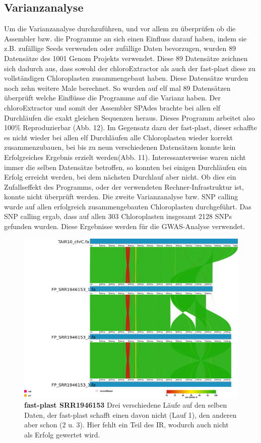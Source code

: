 \documentclass{scrartcl}
\begin{document}
\subsection{Varianzanalyse}
\label{sec-4-7}
Um die Varianzanalyse durchzuführen, und vor allem zu überprüfen ob die Assembler bzw. die Programme an sich einen Einfluss darauf haben, indem sie z.B. zufällige Seeds verwenden oder zufällige Daten bevorzugen, wurden 89 Datensätze
des 1001 Genom Projekts verwendet. Diese 89 Datensätze zeichnen sich dadurch aus, dass sowohl der chloroExtractor als auch der fast-plast diese zu vollständigen Chloroplasten zusammengebaut haben. Diese Datensätze
wurden noch zehn weitere Male berechnet. So wurden auf elf mal 89 Datensätzen überprüft welche Einflüsse die Programme auf die Varianz haben. Der chloroExtractor und somit der Assembler SPAdes brachte bei allen elf
Durchläufen die exakt gleichen Sequenzen heraus. Dieses Programm arbeitet also 100\% Reproduzierbar (Abb. 12). Im Gegensatz dazu der fast-plast, dieser schaffte es nicht wieder bei allen elf Durchläufen alle Chloroplasten wieder
korrekt zusammenzubauen, bei bis zu neun verschiedenen Datensätzen konnte kein Erfolgreiches Ergebnis erzielt werden(Abb. 11). Interessanterweise waren nicht immer die selben Datensätze betroffen, 
so konnten bei einigen Durchläufen
ein Erfolg erreicht werden, bei dem nächsten Durchlauf aber nicht. Ob dies ein Zufallseffekt des Programms, oder der verwendeten Rechner-Infrastruktur ist, konnte nicht überprüft werden.
Die zweite Varianzanalyse bzw. SNP calling wurde auf allen erfolgreich zusammengebauten Chloroplasten durchgeführt. Das SNP calling ergab, dass auf allen 303 Chloroplasten insgesamt 2128 SNPs gefunden wurden. 
Diese Ergebnisse werden für die GWAS-Analyse verwendet.
\begin{figure}
\includegraphics[width=.9\linewidth]{./SRR1946153_FP_1.png}
\caption[fast-plast SRR1946153]{\textbf{fast-plast SRR1946153} Drei verschiedene Läufe auf den selben Daten, der fast-plast schafft einen davon nicht (Lauf 1), den anderen aber schon (2 u. 3). Hier fehlt ein Teil des IR, wodurch auch nicht als Erfolg gewertet wird. }
\end{figure}
\end{document}
